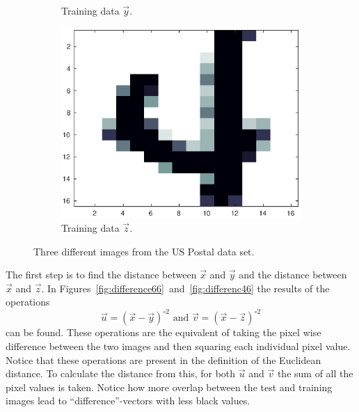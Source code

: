 \begin{figure}[H]
\begin{subfigure}[b]{.3\textwidth}
        \caption{Training data \(\vec{y}\).}\label{fig:train6}
    \end{subfigure}
    \begin{subfigure}[b]{.3\textwidth}
        \includegraphics[width = \linewidth]{images/knn/train4.eps}
        \caption{Training data \(\vec{z}\).}\label{fig:train4}
    \end{subfigure}
    \caption{Three different images from the US Postal data set.}
\end{figure}
The first step is to find the distance between \(\vec{x}\) and \(\vec{y}\) and the distance between \(\vec{x}\) and \(\vec{z}\).
In Figures~\ref{fig:difference66}~and~\ref{fig:differenc46} the results of the operations
\[\vec{u} = {(\vec{x} - \vec{y})}^{\circ 2}\text{ and }\vec{v} = {(\vec{x} - \vec{z})}^{\circ 2}\]
can be found.
These operations are the equivalent of taking the pixel wise difference between the two images and then squaring each individual pixel value.
Notice that these operations are present in the definition of the Euclidean distance.
To calculate the distance from this, for both \(\vec{u}\) and \(\vec{v}\) the sum of all the pixel values is taken.
Notice how more overlap between the test and training images lead to ``difference''-vectors with less black values.

